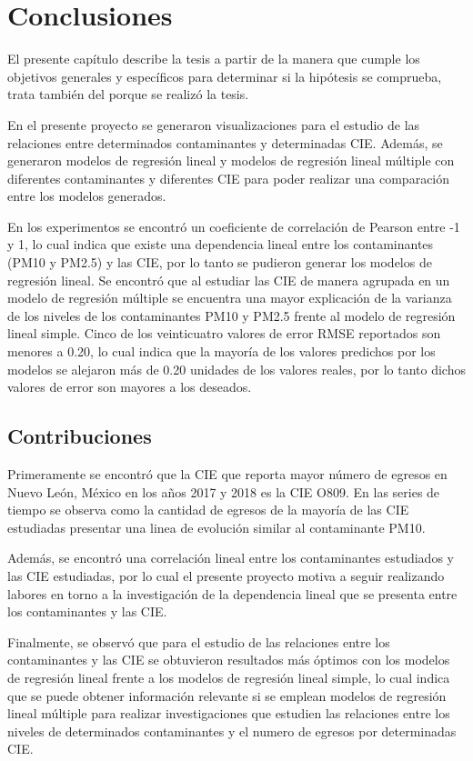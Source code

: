 \chapter{Conclusiones}

El presente capítulo describe la tesis a partir de la manera que cumple los objetivos generales y específicos para determinar si la hipótesis se comprueba, trata también del porque se realizó la tesis.

En el presente proyecto se generaron visualizaciones para el estudio de las relaciones entre determinados contaminantes y determinadas CIE. Además, se generaron modelos de regresión lineal y modelos de regresión lineal múltiple con diferentes contaminantes y diferentes CIE para poder realizar una comparación entre los modelos generados.

En los experimentos se encontró un coeficiente de correlación de Pearson entre -1 y 1, lo cual indica que existe una dependencia lineal entre los contaminantes (PM10 y PM2.5) y las CIE, por lo tanto se pudieron generar los modelos de regresión lineal. Se encontró que al estudiar las CIE de manera agrupada en un modelo de regresión múltiple se encuentra una mayor explicación de la varianza de los niveles de los contaminantes PM10 y PM2.5 frente al modelo de regresión lineal simple. Cinco de los veinticuatro valores de error RMSE reportados son menores a 0.20, lo cual indica que la mayoría de los valores predichos por los modelos se alejaron más de 0.20 unidades de los valores reales, por lo tanto dichos valores de error son mayores a los deseados.

\clearpage
\section{Contribuciones}
Primeramente se encontró que la CIE que reporta mayor número de egresos en Nuevo León, México en los años 2017 y 2018 es la CIE O809. En las series de tiempo se observa como la cantidad de egresos de la mayoría de las CIE estudiadas presentar una linea de evolución similar al contaminante PM10.

Además, se encontró una correlación lineal entre los contaminantes estudiados y las CIE estudiadas, por lo cual el presente proyecto motiva a seguir realizando labores en torno a la investigación de la dependencia lineal que se presenta entre los contaminantes y las CIE.

Finalmente, se observó que para el estudio de las relaciones entre los contaminantes y las CIE se obtuvieron resultados más óptimos con los modelos de regresión lineal frente a los modelos de regresión lineal simple, lo cual indica que se puede obtener información relevante si se emplean modelos de regresión lineal múltiple para realizar investigaciones que estudien las relaciones entre los niveles de determinados contaminantes y el numero de egresos por determinadas CIE.

